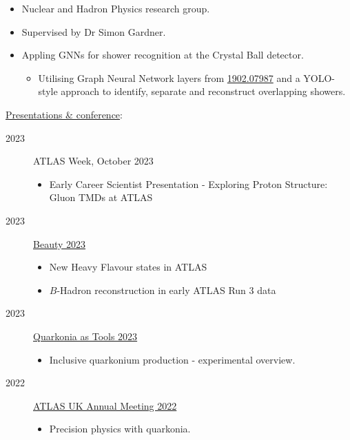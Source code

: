 \documentclass[10pt]{article}
\begin{document}
\begin{bgbox}[height=\paperheight,colback=gray,width=0.7\textwidth]
\begin{description}
\begin{description}
            \begin{itemize}
                \item Nuclear and Hadron Physics research group.
                \item Supervised by Dr Simon Gardner.
                \item Appling GNNs for shower recognition at the Crystal Ball detector.
                \begin{itemize}
                    \item Utilising Graph Neural Network layers from \href{https://arxiv.org/abs/1902.07987}{1902.07987} and a YOLO-style approach to identify, separate and reconstruct overlapping showers.
                \end{itemize}
            \end{itemize}
        \end{description}
        \item \underline{Presentations \& conference}:
        \begin{description}
            \item[2023] {ATLAS Week, October 2023}
            \begin{itemize}
                \item Early Career Scientist Presentation - Exploring Proton Structure: Gluon TMDs at ATLAS
            \end{itemize}
            \item[2023] \href{https://indico.in2p3.fr/event/28579/}{Beauty 2023}
            \begin{itemize}
                \item New Heavy Flavour states in ATLAS
                \item $B$-Hadron reconstruction in early ATLAS Run 3 data
            \end{itemize}
            \item[2023] \href{https://indico.cern.ch/event/1213416/}{Quarkonia as Tools 2023}
            \begin{itemize}
                \item Inclusive quarkonium production - experimental overview. 
            \end{itemize}
            \item[2022] \href{https://indico.cern.ch/event/1077305/}{ATLAS UK Annual Meeting 2022}
            \begin{itemize}
                \item Precision physics with quarkonia.

\end{itemize}
\end{description}
\end{description}
\end{bgbox}
\end{document}
